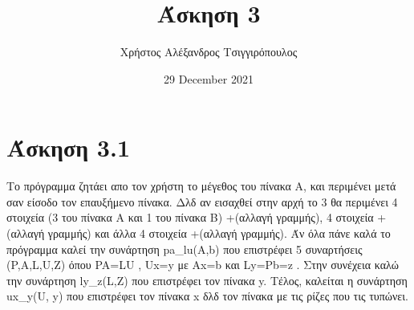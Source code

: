 \documentclass{article}
\title{Άσκηση 3}
\author{Χρήστος Αλέξανδρος Τσιγγιρόπουλος}
\date{29 December 2021}
\begin{document}
    \maketitle
    \section{Άσκηση 3.1}
    
    Το πρόγραμμα ζητάει απο τον χρήστη το μέγεθος του πίνακα Α,
    και περιμένει μετά σαν είσοδο τον επαυξήμενο πίνακα. 
    Δλδ αν εισαχθεί στην αρχή το 3 θα περιμένει 4 στοιχεία (3 του πίνακα Α και 1 του πίνακα Β) +(αλλαγή γραμμής), 4 στοιχεία +(αλλαγή γραμμής) και άλλα 4 στοιχεία +(αλλαγή γραμμής).
    Άν όλα πάνε καλά το πρόγραμμα καλεί την συνάρτηση pa\_lu(Α,b) 
    που επιστρέφει 5 συναρτήσεις (P,A,L,U,Z) όπου PA=LU , Ux=y με Ax=b
    και Ly=Pb=z . Στην συνέχεια καλώ την συνάρτηση ly\_z(L,Z) που επιστρέφει τον πίνακα y. Τέλος, καλείται η συνάρτηση ux\_y(U, y)
    που επιστρέφει τον πίνακα x δλδ τον πίνακα με τις ρίζες που τις τυπώνει.
    
\end{document}
